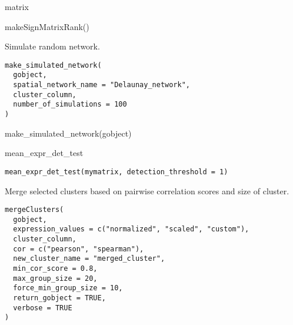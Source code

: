 \documentclass[a4paper]{book}
\begin{document}
%
\begin{Value}
matrix
\end{Value}
%
\begin{SeeAlso}\relax
{}
\end{SeeAlso}
%
\begin{Examples}
\begin{ExampleCode}
    makeSignMatrixRank()
\end{ExampleCode}
\end{Examples}
%
\begin{Description}\relax
Simulate random network.
\end{Description}
%
\begin{Usage}
\begin{verbatim}
make_simulated_network(
  gobject,
  spatial_network_name = "Delaunay_network",
  cluster_column,
  number_of_simulations = 100
)
\end{verbatim}
\end{Usage}
%
\begin{Examples}
\begin{ExampleCode}
    make_simulated_network(gobject)
\end{ExampleCode}
\end{Examples}
%
\begin{Description}\relax
mean\_expr\_det\_test
\end{Description}
%
\begin{Usage}
\begin{verbatim}
mean_expr_det_test(mymatrix, detection_threshold = 1)
\end{verbatim}
\end{Usage}
%
\begin{Description}\relax
Merge selected clusters based on pairwise correlation scores and size of cluster.
\end{Description}
%
\begin{Usage}
\begin{verbatim}
mergeClusters(
  gobject,
  expression_values = c("normalized", "scaled", "custom"),
  cluster_column,
  cor = c("pearson", "spearman"),
  new_cluster_name = "merged_cluster",
  min_cor_score = 0.8,
  max_group_size = 20,
  force_min_group_size = 10,
  return_gobject = TRUE,
  verbose = TRUE
)
\end{verbatim}
\end{Usage}
\end{document}
